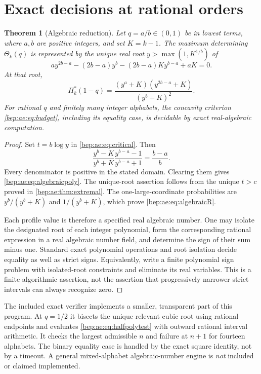 \documentclass[11pt]{article}
\numberwithin{equation}{section}
\newtheorem{theorem}{Theorem}[section]
\theoremstyle{definition}
\theoremstyle{remark}
\begin{document}
\section{Exact decisions at rational orders}\label{bep:ae:sec:decision}
\begin{theorem}[Algebraic reduction]\label{bep:ae:thm:algebraic}
Let $q=a/b\in(0,1)$ be in lowest terms, where $a,b$ are positive
integers, and set $K=k-1$. The maximum determining $\Theta_k(q)$ is
represented by the unique real root
$y>\max(1,K^{1/b})$ of
\begin{equation}\label{bep:ae:eq:algebraicpoly}
 a y^{2b-a}-(2b-a)y^b-(2b-a)K y^{b-a}+aK=0.
\end{equation}
At that root,
\begin{equation}\label{bep:ae:eq:algebraicR}
 \Pi^{*}_k(1-q)=
 \frac{(y^a+K)(y^{2b-a}+K)}{(y^b+K)^2}.
\end{equation}
For rational $q$ and finitely many integer alphabets, the concavity
criterion \eqref{bep:ae:eq:budget}, including its equality case, is decidable
by exact real-algebraic computation.
\end{theorem}
\begin{proof}
Set $t=b\log y$ in \eqref{bep:ae:eq:critical}. Then
\[
 \frac{y^b-K}{y^b+K}\frac{y^{b-a}-1}{y^{b-a}+1}
 =\frac{b-a}{b}.
\]
Every denominator is positive in the stated domain. Clearing them gives
\eqref{bep:ae:eq:algebraicpoly}. The unique-root assertion follows from the
unique $t>c$ proved in \cref{bep:ae:thm:extremal}. The one-large-coordinate
probabilities are $y^b/(y^b+K)$ and $1/(y^b+K)$, which prove
\eqref{bep:ae:eq:algebraicR}.

Each profile value is therefore a specified real algebraic number.
One may isolate the designated root of each integer polynomial, form
the corresponding rational expression in a real algebraic number field,
and determine the sign of their sum minus one. Standard exact polynomial
operations and root isolation decide equality as well as strict signs.
Equivalently, write a finite polynomial sign problem with isolated-root
constraints and eliminate its real variables. This is a finite
algorithmic assertion, not the assertion that progressively narrower
strict intervals can always recognize zero.
\end{proof}

The included exact verifier implements a smaller, transparent part of
this program. At $q=1/2$ it bisects the unique relevant cubic root using
rational endpoints and evaluates \eqref{bep:ae:eq:halfpolytest} with outward
rational interval arithmetic. It checks the largest admissible $n$ and
failure at $n+1$ for fourteen alphabets. The binary equality case is
handled by the exact square identity, not by a timeout. A general
mixed-alphabet algebraic-number engine is \emph{not} included or claimed
implemented.
\end{document}
